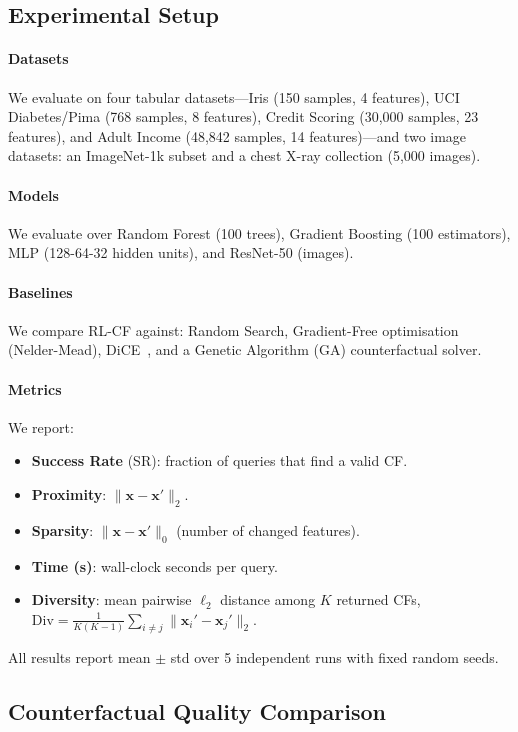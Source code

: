 \documentclass[conference]{IEEEtran}
\newcommand{\bx}{\mathbf{x}}
\newcommand{\bxp}{\mathbf{x}'}
\begin{document}
\subsection{Experimental Setup}

\paragraph{Datasets} We evaluate on four tabular datasets---Iris (150 samples,
4 features), UCI Diabetes/Pima (768 samples, 8 features), Credit Scoring
(30,000 samples, 23 features), and Adult Income (48,842 samples, 14
features)---and two image datasets: an ImageNet-1k subset and a chest X-ray
collection (5,000 images).

\paragraph{Models} We evaluate over Random Forest (100 trees), Gradient
Boosting (100 estimators), MLP (128-64-32 hidden units), and ResNet-50 (images).

\paragraph{Baselines} We compare RL-CF against: Random Search, Gradient-Free
optimisation (Nelder-Mead), DiCE~\cite{mothilal2020dice}, and a Genetic
Algorithm (GA) counterfactual solver.

\paragraph{Metrics} We report:
\begin{itemize}
  \item \textbf{Success Rate} (SR): fraction of queries that find a valid CF.
  \item \textbf{Proximity}: $\|\bx-\bxp\|_2$.
  \item \textbf{Sparsity}: $\|\bx-\bxp\|_0$ (number of changed features).
  \item \textbf{Time (s)}: wall-clock seconds per query.
  \item \textbf{Diversity}: mean pairwise $\ell_2$ distance among $K$ returned CFs,
    $\text{Div}=\frac{1}{K(K-1)}\sum_{i\neq j}\|\bx_i'-\bx_j'\|_2$.
\end{itemize}
All results report mean $\pm$ std over 5 independent runs with fixed random seeds.

\subsection{Counterfactual Quality Comparison}
\end{document}
